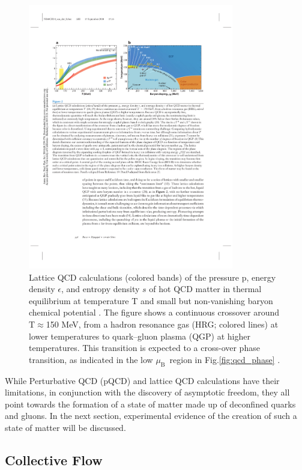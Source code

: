 \begin{figure}[htpb]
  \centering
  \includegraphics[width=0.8\textwidth]{Introduction/lattice_qcd.pdf}
  \caption{Lattice QCD calculations (colored bands) of the pressure p, energy density $\epsilon$, and entropy density $s$ of hot QCD matter in thermal equilibrium at temperature T and small but non-vanishing baryon chemical potential \cite{Borsanyi2014,HotQCDCollaboration2014}. The figure shows a continuous crossover around T$\approx$150 MeV, from a hadron resonance gas (HRG; colored lines) at lower temperatures to quark–gluon plasma (QGP) at higher temperatures. This transition is expected to a cross-over phase transition, as indicated in the low $\mu_\mathrm{B}$~region in Fig.\ref{fig:qcd_phase} \cite{annurev-nucl}.}
  \label{fig:lattice_qcd}
\end{figure}


While Perturbative QCD (pQCD) and lattice QCD calculations have their limitations, in conjunction with the discovery of asymptotic freedom, they all point towards the formation of a state of matter made up of deconfined quarks and gluons. In the next section, experimental evidence of the creation of such a state of matter will be discussed. 

\subsection{Collective Flow}\label{sec:flow}

